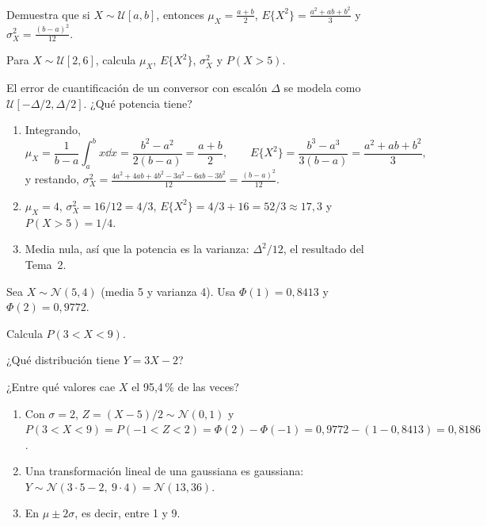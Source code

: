 \documentclass[11pt,a4paper]{scrartcl}
\begin{document}
\begin{ejercicio}
  \begin{incisos}[1]
    \item Demuestra que si $X\sim\mathcal U[a,b]$, entonces $\mu_X=\frac{a+b}2$, $E\{X^2\}=\frac{a^2+ab+b^2}3$ y $\sigma_X^2=\frac{(b-a)^2}{12}$.
    \item Para $X\sim\mathcal U[2,6]$, calcula $\mu_X$, $E\{X^2\}$, $\sigma_X^2$ y $P(X>5)$.
    \item El error de cuantificación de un conversor con escalón $\Delta$ se modela como $\mathcal U[-\Delta/2,\Delta/2]$. ¿Qué potencia tiene?
  \end{incisos}
\end{ejercicio}
\begin{solucion}
  \begin{enumerate}[label=\alph*)]
    \item Integrando,
    \[
      \mu_X=\frac1{b-a}\int_a^bx\dd x=\frac{b^2-a^2}{2(b-a)}=\frac{a+b}2,\qquad E\{X^2\}=\frac{b^3-a^3}{3(b-a)}=\frac{a^2+ab+b^2}3,
    \]
    y restando, $\sigma_X^2=\frac{4a^2+4ab+4b^2-3a^2-6ab-3b^2}{12}=\frac{(b-a)^2}{12}$.
    \item $\mu_X=4$, $\sigma_X^2=16/12=4/3$, $E\{X^2\}=4/3+16=52/3\approx17{,}3$ y $P(X>5)=1/4$.
    \item Media nula, así que la potencia es la varianza: $\Delta^2/12$, el resultado del Tema~2.
  \end{enumerate}
\end{solucion}

\begin{ejercicio}
  Sea $X\sim\mathcal N(5,4)$ (media 5 y varianza 4). Usa $\Phi(1)=0{,}8413$ y $\Phi(2)=0{,}9772$.
  \begin{incisos}[1]
    \item Calcula $P(3<X<9)$.
    \item ¿Qué distribución tiene $Y=3X-2$?
    \item ¿Entre qué valores cae $X$ el 95,4\,\% de las veces?
  \end{incisos}
\end{ejercicio}
\begin{solucion}
  \begin{enumerate}[label=\alph*)]
    \item Con $\sigma=2$, $Z=(X-5)/2\sim\mathcal N(0,1)$ y $P(3<X<9)=P(-1<Z<2)=\Phi(2)-\Phi(-1)=0{,}9772-(1-0{,}8413)=0{,}8186$.
    \item Una transformación lineal de una gaussiana es gaussiana: $Y\sim\mathcal N(3\cdot5-2,\ 9\cdot4)=\mathcal N(13,36)$.
    \item En $\mu\pm2\sigma$, es decir, entre 1 y 9.
  \end{enumerate}
\end{solucion}
\end{document}
